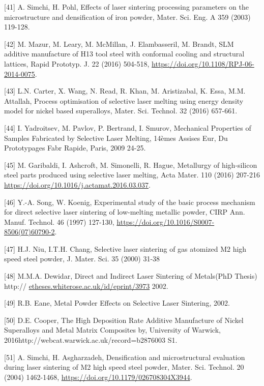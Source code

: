 \documentclass[10pt]{article}
\begin{document}
[41] A. Simchi, H. Pohl, Effects of laser sintering processing parameters on the microstructure and densification of iron powder, Mater. Sci. Eng. A 359 (2003) 119-128.

[42] M. Mazur, M. Leary, M. McMillan, J. Elambasseril, M. Brandt, SLM additive manufacture of H13 tool steel with conformal cooling and structural lattices, Rapid Prototyp. J. 22 (2016) 504-518, \href{https://doi.org/10.1108/RPJ-06-2014-0075}{https://doi.org/10.1108/RPJ-06-2014-0075}.

[43] L.N. Carter, X. Wang, N. Read, R. Khan, M. Aristizabal, K. Essa, M.M. Attallah, Process optimisation of selective laser melting using energy density model for nickel based superalloys, Mater. Sci. Technol. 32 (2016) 657-661.

[44] I. Yadroitsev, M. Pavlov, P. Bertrand, I. Smurov, Mechanical Properties of Samples Fabricated by Selective Laser Melting, 14èmes Assises Eur, Du Prototypages Fabr Rapide, Paris, 2009 24-25.

[45] M. Garibaldi, I. Ashcroft, M. Simonelli, R. Hague, Metallurgy of high-silicon steel parts produced using selective laser melting, Acta Mater. 110 (2016) 207-216 \href{https://doi.org/10.1016/j.actamat.2016.03.037}{https://doi.org/10.1016/j.actamat.2016.03.037}.

[46] Y.-A. Song, W. Koenig, Experimental study of the basic process mechanism for direct selective laser sintering of low-melting metallic powder, CIRP Ann. Manuf. Technol. 46 (1997) 127-130, \href{https://doi.org/10.1016/S0007-8506(07)60790-2}{https://doi.org/10.1016/S0007-8506(07)60790-2}.

[47] H.J. Niu, I.T.H. Chang, Selective laser sintering of gas atomized M2 high speed steel powder, J. Mater. Sci. 35 (2000) 31-38

[48] M.M.A. Dewidar, Direct and Indirect Laser Sintering of Metals(PhD Thesis) http:// \href{http://etheses.whiterose.ac.uk/id/eprint/3973}{etheses.whiterose.ac.uk/id/eprint/3973} 2002.

[49] R.B. Eane, Metal Powder Effects on Selective Laser Sintering, 2002.

[50] D.E. Cooper, The High Deposition Rate Additive Manufacture of Nickel Superalloys and Metal Matrix Composites by, University of Warwick, 2016http://webcat.warwick.ac.uk/record=b2876003 S1.

[51] A. Simchi, H. Asgharzadeh, Densification and microstructural evaluation during laser sintering of M2 high speed steel powder, Mater. Sci. Technol. 20 (2004) 1462-1468, \href{https://doi.org/10.1179/026708304X3944}{https://doi.org/10.1179/026708304X3944}.
\end{document}
